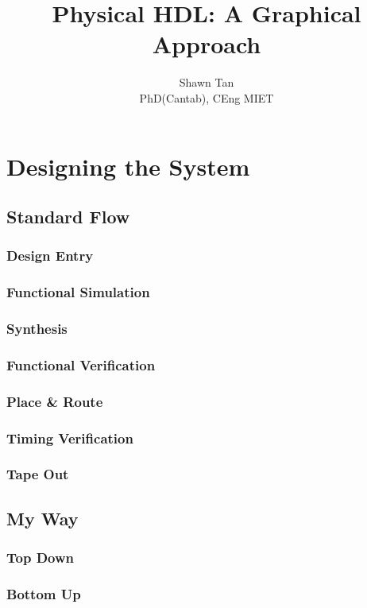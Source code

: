 \documentclass[a4paper,11pt]{book}
\title{Physical HDL: A Graphical Approach}
\author{Shawn Tan\\ \tiny{PhD(Cantab), CEng MIET}}
\begin{document}
\frontmatter
\maketitle
\tableofcontents



\mainmatter
\onehalfspace

\part{Designing the System}
\chapter{Standard Flow}
\section{Design Entry}
\section{Functional Simulation}
\section{Synthesis}
\section{Functional Verification}
\section{Place \& Route}
\section{Timing Verification}
\section{Tape Out}


\chapter{My Way}
\section{Top Down}
\section{Bottom Up}
\end{document}
